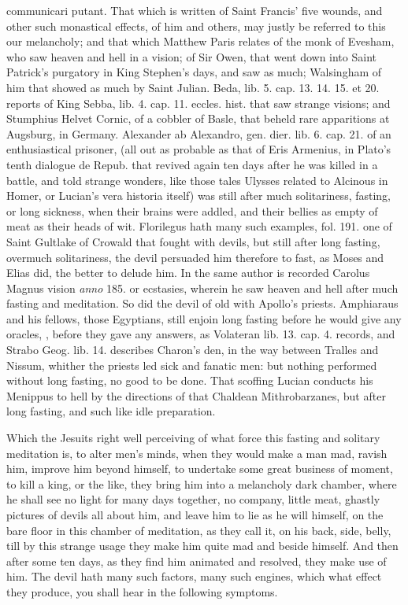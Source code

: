 {{communicari putant}. That which is written of Saint Francis' five
wounds, and other such monastical effects, of him and others, may
justly be referred to this our melancholy; and that which Matthew Paris
relates of the monk of Evesham, who saw heaven and hell in a
vision; of Sir Owen, that went down into Saint Patrick's
purgatory in King Stephen's days, and saw as much; Walsingham of him
that showed as much by Saint Julian. Beda, \textlatin{lib. 5. cap. 13. 14. 15.} et
20. reports of King Sebba, \textlatin{lib. 4. cap. 11. eccles. hist.} that saw
strange visions; and Stumphius Helvet Cornic, of a cobbler of Basle,
that beheld rare apparitions at Augsburg, in Germany. Alexander
ab Alexandro, \textlatin{gen. dier. lib. 6. cap. 21.} of an enthusiastical
prisoner, (all out as probable as that of Eris Armenius, in Plato's
tenth dialogue \textlatin{de Repub.} that revived again ten days after he was
killed in a battle, and told strange wonders, like those tales Ulysses
related to Alcinous in Homer, or Lucian's \textlatin{vera historia} itself) was
still after much solitariness, fasting, or long sickness, when their
brains were addled, and their bellies as empty of meat as their heads
of wit. Florilegus hath many such examples, \textlatin{fol. 191.} one of Saint
Gultlake of Crowald that fought with devils, but still after long
fasting, overmuch solitariness, the devil persuaded him therefore
to fast, as Moses and Elias did, the better to delude him. In the
same author is recorded Carolus Magnus vision \emph{anno} 185. or ecstasies,
wherein he saw heaven and hell after much fasting and meditation. So
did the devil of old with Apollo's priests. Amphiaraus and his fellows,
those Egyptians, still enjoin long fasting before he would give any
oracles, , before they gave any
answers, as Volateran \textlatin{lib. 13. cap. 4.} records, and Strabo \textlatin{Geog. lib.
14.} describes Charon's den, in the way between Tralles and Nissum,
whither the priests led sick and fanatic men: but nothing performed
without long fasting, no good to be done. That scoffing Lucian
conducts his Menippus to hell by the directions of that Chaldean
Mithrobarzanes, but after long fasting, and such like idle preparation.

Which the Jesuits right well perceiving of what force this fasting and
solitary meditation is, to alter men's minds, when they would make a
man mad, ravish him, improve him beyond himself, to undertake some
great business of moment, to kill a king, or the like, they bring
him into a melancholy dark chamber, where he shall see no light for
many days together, no company, little meat, ghastly pictures of devils
all about him, and leave him to lie as he will himself, on the bare
floor in this chamber of meditation, as they call it, on his back,
side, belly, till by this strange usage they make him quite mad and
beside himself. And then after some ten days, as they find him animated
and resolved, they make use of him. The devil hath many such factors,
many such engines, which what effect they produce, you shall hear in
the following symptoms.

}
